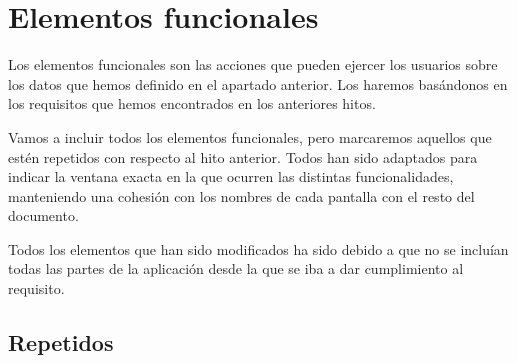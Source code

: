 \section{Elementos funcionales}

Los elementos funcionales son las acciones que pueden ejercer los usuarios
sobre los datos que hemos definido en el apartado anterior. Los haremos basándonos
en los requisitos que hemos encontrados en los anteriores hitos.

Vamos a incluir todos los elementos funcionales, pero marcaremos aquellos que estén
repetidos con respecto al hito anterior. Todos han sido adaptados para indicar la ventana exacta
en la que ocurren las distintas funcionalidades, manteniendo una cohesión con los nombres de
cada pantalla con el resto del documento.

Todos los elementos que han sido modificados ha sido debido a que no se incluían todas las partes de
la aplicación desde la que se iba a dar cumplimiento al requisito.

\subsection*{Repetidos}

